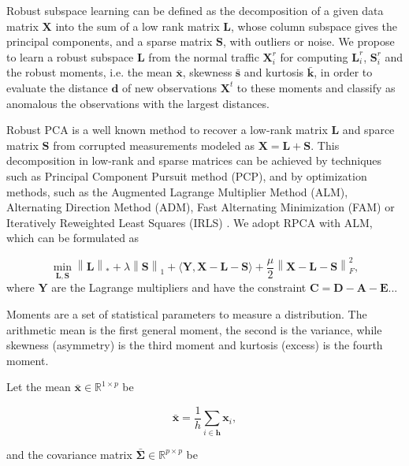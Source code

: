 \documentclass[review]{elsarticle}
\begin{document}
Robust subspace learning can be defined as the decomposition of a given data matrix $\textbf{X}$ into the sum of a low rank matrix $\textbf{L}$, whose column subspace gives the principal components, and a sparse matrix $\textbf{S}$, with outliers or noise. We propose to learn a robust subspace $\textbf{L}$ from the normal traffic $\textbf{X}_i^r$ for computing $\textbf{L}_i^r$, $\textbf{S}_i^r$ and the robust moments, i.e. the mean $\boldsymbol{\bar{x}}$, skewness $\boldsymbol{\bar{s}}$ and kurtosis $\boldsymbol{\bar{k}}$, in order to evaluate the distance $\boldsymbol{d}$ of new observations $\boldsymbol{X}^t$ to these moments and classify as anomalous the observations with the largest distances.

Robust PCA is a well known method to recover a low-rank matrix $\textbf{L}$ and sparce matrix $\textbf{S}$ from corrupted measurements modeled as $\textbf{X} = \textbf{L} + \textbf{S}$. This decomposition in low-rank and sparse matrices can be achieved by techniques such as Principal Component Pursuit method (PCP), and by optimization methods, such as the Augmented Lagrange Multiplier Method (ALM), Alternating Direction Method (ADM), Fast Alternating Minimization (FAM) or Iteratively Reweighted Least Squares (IRLS) \cite{candes2011robust,vaswani2018robust,lerman2018overview}. We adopt RPCA with ALM, which can be formulated as 

\begin{equation}\label{eq:eq01}
	\min_{\boldsymbol{L,S}}\left\|\boldsymbol{L}\right\|_* + \lambda\left\|\boldsymbol{S}\right\|_1 + \langle \boldsymbol{Y, X - L - S}  \rangle + \frac{\mu}{2}\left\|\boldsymbol{X - L - S}\right\|_F^2,
\end{equation}
where $\boldsymbol{Y}$ are the Lagrange multipliers and have the constraint $\boldsymbol{C = D - A - E}$...
	    
Moments are a set of statistical parameters to measure a distribution. The arithmetic mean is the first general moment, the second is the variance, while skewness (asymmetry) is the third moment and kurtosis (excess) is the fourth moment.

Let the mean $\bar{\boldsymbol{x}} \in \mathbb{R}^{1 \times p}$ be

\begin{equation}\label{eq:eq02}
	\bar{\boldsymbol{x}} = \displaystyle\frac{1}{h}\displaystyle\sum_{i\in \boldsymbol{h}} \boldsymbol{x}_i, 
\end{equation}

and the covariance matrix $\boldsymbol{\bar{\Sigma}} \in \mathbb{R}^{p \times p}$ be
\end{document}
